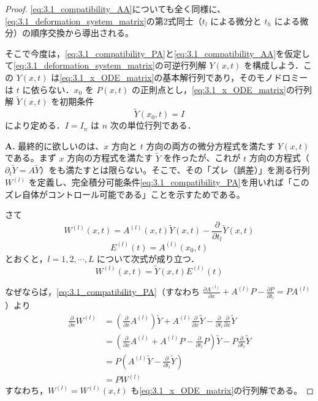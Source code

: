 \begin{story}
\begin{proof}
\eqref{eq:3.1_compatibility_AA}についても全く同様に、\eqref{eq:3.1_deformation_system_matrix}の第2式同士（$t_l$ による微分と $t_h$ による微分）の順序交換から導出される。

そこで今度は，\eqref{eq:3.1_compatibility_PA}と\eqref{eq:3.1_compatibility_AA}を仮定して\eqref{eq:3.1_deformation_system_matrix}の可逆行列解 $Y(x,t)$ を構成しよう．この $Y(x,t)$ は\eqref{eq:3.1_x_ODE_matrix}の基本解行列であり，そのモノドロミーは $t$ に依らない．$x_0$ を $P(x,t)$ の正則点とし，\eqref{eq:3.1_x_ODE_matrix}の行列解 $\tilde{Y}(x,t)$ を初期条件
\[
  \tilde{Y}(x_0,t) = I
\]
により定める．$I=I_n$ は $n$ 次の単位行列である．


\begin{Q}
\textbf{A.} 最終的に欲しいのは、$x$ 方向と $t$ 方向の両方の微分方程式を満たす $Y(x,t)$ である。まず $x$ 方向の方程式を満たす $\tilde{Y}$ を作ったが、これが $t$ 方向の方程式（$\partial_t \tilde{Y} = A\tilde{Y}$）をも満たすとは限らない。そこで、その「ズレ（誤差）」を測る行列 $W^{(l)}$ を定義し、完全積分可能条件\eqref{eq:3.1_compatibility_PA}を用いれば「このズレ自体がコントロール可能である」ことを示すためである。
\end{Q}

さて
\begin{equation}\label{eq:W_def}
  W^{(l)}(x,t) = A^{(l)}(x,t)\tilde{Y}(x,t) - \frac{\partial}{\partial t_l}\tilde{Y}(x,t)
\end{equation}
\[
  E^{(l)}(t) = A^{(l)}(x_0,t)
\]
とおくと，$l=1,2,\cdots,L$ について次式が成り立つ．
\begin{equation}\label{eq:W_rel}
  W^{(l)}(x,t) = \tilde{Y}(x,t)E^{(l)}(t)
\end{equation}

なぜならば，\eqref{eq:3.1_compatibility_PA}（すなわち $\frac{\partial A^{(l)}}{\partial x} + A^{(l)}P - \frac{\partial P}{\partial t_l} = PA^{(l)}$）より
\begin{align*}
  \frac{\partial}{\partial x}W^{(l)} 
  &= \left( \frac{\partial}{\partial x}A^{(l)} \right)\tilde{Y} + A^{(l)}\frac{\partial}{\partial x}\tilde{Y} - \frac{\partial}{\partial t_l}\frac{\partial}{\partial x}\tilde{Y} \\[2mm]
  &= \left( \frac{\partial}{\partial x}A^{(l)} + A^{(l)}P - \frac{\partial}{\partial t_l}P \right)\tilde{Y} - P\frac{\partial}{\partial t_l}\tilde{Y} \\[2mm]
  &= P \left( A^{(l)}\tilde{Y} - \frac{\partial}{\partial t_l}\tilde{Y} \right) \\[2mm]
  &= P W^{(l)}
\end{align*}
すなわち，$W^{(l)} = W^{(l)}(x,t)$ も\eqref{eq:3.1_x_ODE_matrix}の行列解である。


\end{proof}
\end{story}

